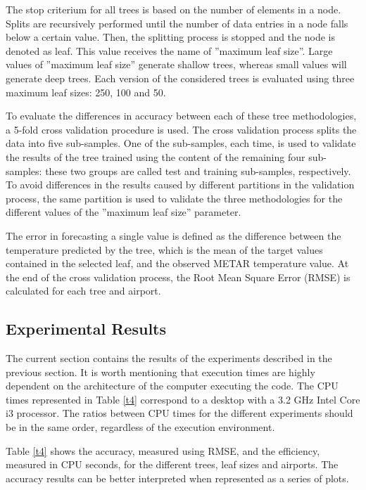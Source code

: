 \documentclass[times,twocolumn,final,authoryear]{elsarticle}
\begin{document}
The stop criterium for all trees is based on the number of elements in a node. Splits are recursively performed until the number of data entries in a node falls below a certain value. Then, the splitting process is stopped and the node is denoted as leaf. This value receives the name of ”maximum leaf size”. Large values of ”maximum leaf size” generate shallow trees, whereas small values will generate deep trees. Each version of the considered trees is evaluated using three maximum leaf sizes: 250, 100 and 50.

To evaluate the differences in accuracy between each of these tree methodologies, a 5-fold cross validation procedure is used. The cross validation process splits the data into five sub-samples. One of the sub-samples, each time, is used to validate the results of the tree trained using the content of the remaining four sub-samples: these two groups are called test and training sub-samples, respectively. To avoid differences in the results caused by different partitions in the validation process, the same partition is used to validate the three methodologies for the different values of the ”maximum leaf size” parameter.

The error in forecasting a single value is defined as the difference between the temperature predicted by the tree, which is the mean of the target values contained in the selected leaf, and the observed METAR temperature value. At the end of the cross validation process, the Root Mean Square Error (RMSE) is calculated for each tree and airport.


\subsection{Experimental Results}
\label{sec:4.3}

The current section contains the results of the experiments described in the previous section.
It is worth mentioning that execution times are highly dependent on the architecture of the computer executing the code. The CPU times represented in Table \ref{t4} correspond to a desktop with a 3.2 GHz Intel Core i3 processor. The ratios between CPU times for the different experiments should be in the same order, regardless of the execution environment.

Table \ref{t4} shows the accuracy, measured using RMSE, and the efficiency, measured in CPU seconds, for the different trees, leaf sizes and airports. The accuracy results can be better interpreted when represented as a series of plots.
\end{document}
